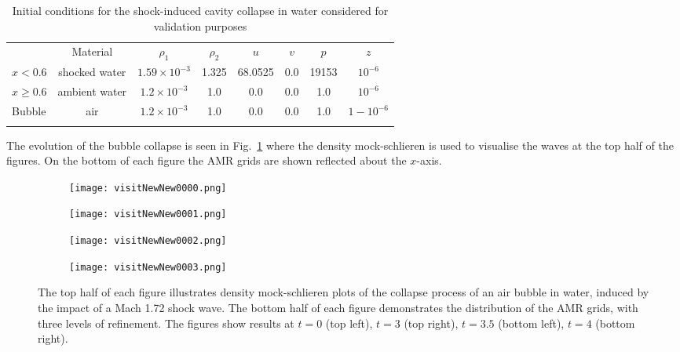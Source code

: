 \documentclass[3p,times,twocolumn]{elsarticle}
\begin{document}
\begin{table*}
\centering
\caption {Initial conditions for the shock-induced cavity collapse in  water considered for validation purposes}
\label{ICval}
\begin{tabular}{lccccccc}
\hline\noalign{\smallskip}
 & Material & $\rho_1$ & $\rho_{2}$ & $u$ & $v$ & $p$  & $z$  \\
\noalign{\smallskip}\hline\noalign{\smallskip}
$x<0.6$ & shocked water & $1.59\times10^{-3}$ & 1.325 & 68.0525 & 0.0 & 19153 & $10^{-6}$ \\
$x\ge 0.6$  & ambient water  & $1.2\times10^{-3}$ & 1.0 & 0.0 & 0.0 & 1.0 & $10^{-6}$ \\
 Bubble & air & $1.2\times10^{-3}$ & 1.0 & 0.0 & 0.0 & 1.0 & $1-10^{-6}$ \\
\noalign{\smallskip}\hline
\end{tabular}
\end{table*}


The evolution of the bubble collapse is seen in Fig.\ \ref{waterShockBubble} where the density mock-schlieren is used to visualise the waves at the top half of the figures. On the bottom of each figure the AMR grids are shown reflected about the $x$-axis. 


\begin{figure}
\begin{minipage}{\columnwidth}
\centering
        \begin{subfigure}[b]{0.49\textwidth}
\texttt{[image: visitNewNew0000.png]}
        \end{subfigure}
\vspace{0.15cm}
\begin{subfigure}[b]{0.49\textwidth}
\texttt{[image: visitNewNew0001.png]}
        \end{subfigure}
\vspace{0.15cm}
\end{minipage}
\begin{minipage}{\columnwidth}
\centering        
\begin{subfigure}[b]{0.49\textwidth}
\texttt{[image: visitNewNew0002.png]}
        \end{subfigure}
\begin{subfigure}[b]{0.49\textwidth}
\texttt{[image: visitNewNew0003.png]}
        \end{subfigure}
\end{minipage}
\caption{The top half of each figure illustrates density mock-schlieren plots of the collapse process
of an air bubble in water, induced by the impact of a Mach 1.72 shock wave. The bottom half of each figure demonstrates the distribution of the AMR grids, with three levels of refinement. The figures show results at $t=0$ (top left), $t=3$ (top right), $t=3.5$ (bottom left), $t=4$ (bottom right).}
\label{waterShockBubble}
\end{figure}
\end{document}
